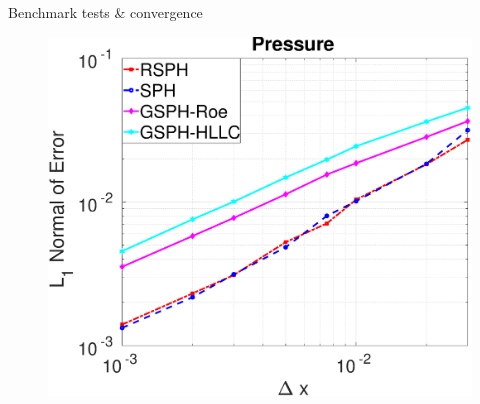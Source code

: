 \documentclass{beamer}
\begin{document}
\begin{frame}{Benchmark tests \& convergence}
\begin{figure}
    \begin{minipage}{.3 \textwidth}
        \centering
        \includegraphics[width=0.95 \textwidth]{./Chapter-4/Figures/Accuracy-pre}
    \end{minipage}%
\end{figure}     
\end{frame}
%
\end{document}
